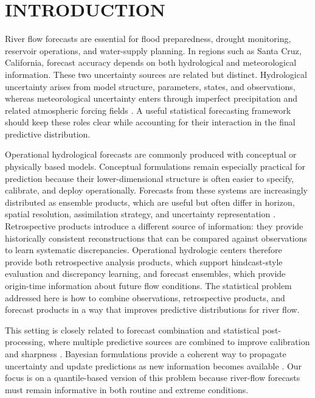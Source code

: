 \documentclass[APA,STIX1COL]{WileyNJD-v2}
\begin{document}
\section{INTRODUCTION}

River flow forecasts are essential for flood preparedness, drought monitoring, reservoir operations, and water-supply planning. In regions such as Santa Cruz, California, forecast accuracy depends on both hydrological and meteorological information. These two uncertainty sources are related but distinct. Hydrological uncertainty arises from model structure, parameters, states, and observations, whereas meteorological uncertainty enters through imperfect precipitation and related atmospheric forcing fields \citep{tarek2021daily, thiboult2016accounting, kim2019hybrid, haiden2021evaluation}. A useful statistical forecasting framework should keep these roles clear while accounting for their interaction in the final predictive distribution.

Operational hydrological forecasts are commonly produced with conceptual or physically based models. Conceptual formulations remain especially practical for prediction because their lower-dimensional structure is often easier to specify, calibrate, and deploy operationally. Forecasts from these systems are increasingly distributed as ensemble products, which are useful but often differ in horizon, spatial resolution, assimilation strategy, and uncertainty representation \citep{molteni1996ecmwf, isaksen2010ensemble, demargne2013science, barlage2021importance, johnson2023comprehensive}. Retrospective products introduce a different source of information: they provide historically consistent reconstructions that can be compared against observations to learn systematic discrepancies. Operational hydrologic centers therefore provide both retrospective analysis products, which support hindcast-style evaluation and discrepancy learning, and forecast ensembles, which provide origin-time information about future flow conditions. The statistical problem addressed here is how to combine observations, retrospective products, and forecast products in a way that improves predictive distributions for river flow.

This setting is closely related to forecast combination and statistical post-processing, where multiple predictive sources are combined to improve calibration and sharpness \citep{siegert2019forecast, vannitsem, wang2022forecastcombinations50yearreview}. Bayesian formulations provide a coherent way to propagate uncertainty and update predictions as new information becomes available \citep{duan2006bma, yumnam2022quantile, aastveit2022quantifying, du2018ensemble_forecasting, doubleday, kleiber2011geostatistical, mcalinn2019dynamic, tallman2023bayesianpredictivedecisionsynthesis, johnson2023bayesian}. Our focus is on a quantile-based version of this problem because river-flow forecasts must remain informative in both routine and extreme conditions.
\end{document}
